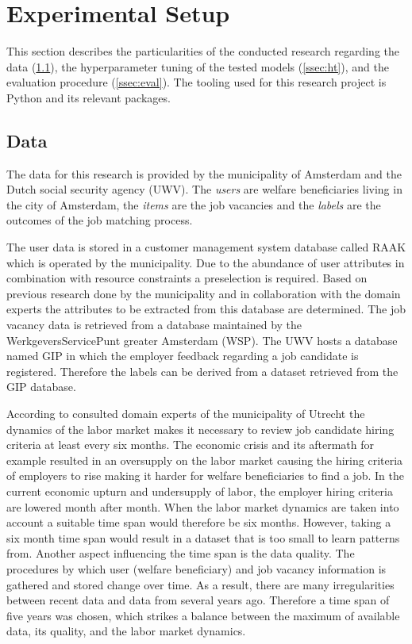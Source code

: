 \section{Experimental Setup}
\label{sec:setup}
This section describes the particularities of the conducted research regarding the data (\ref{ssec:data}), the hyperparameter tuning of the tested models (\ref{ssec:ht}), and the evaluation procedure (\ref{ssec:eval}). 
The tooling used for this research project is Python and its relevant packages.

\subsection{Data}
\label{ssec:data}
The data for this research is provided by the municipality of Amsterdam and the Dutch social security agency (UWV).
The \textit{users} are welfare beneficiaries living in the city of Amsterdam, the \textit{items} are the job vacancies and the \textit{labels} are the outcomes of the job matching process.

The user data is stored in a customer management system database called RAAK which is operated by the municipality.
Due to the abundance of user attributes in combination with resource constraints a preselection is required. 
Based on previous research done by the municipality and in collaboration with the domain experts the attributes to be extracted from this database are determined. 
The job vacancy data is retrieved from a database maintained by the WerkgeversServicePunt greater Amsterdam (WSP).
The UWV hosts a database named GIP in which the employer feedback regarding a job candidate is registered.
Therefore the labels can be derived from a dataset retrieved from the GIP database.

According to consulted domain experts of the municipality of Utrecht the dynamics of the labor market makes it necessary to review job candidate hiring criteria at least every six months.
The economic crisis and its aftermath for example resulted in an oversupply on the labor market causing the hiring criteria of employers to rise making it harder for welfare beneficiaries to find a job.
In the current economic upturn and undersupply of labor, the employer hiring criteria are lowered month after month. 
When the labor market dynamics are taken into account a suitable time span would therefore be six months.
However, taking a six month time span would result in a dataset that is too small to learn patterns from.
Another aspect influencing the time span is the data quality.
The procedures by which user (welfare beneficiary) and job vacancy information is gathered and stored change over time.
As a result, there are many irregularities between recent data and data from several years ago.
Therefore a time span of five years was chosen, which strikes a balance between the maximum of available data, its quality, and the labor market dynamics.

